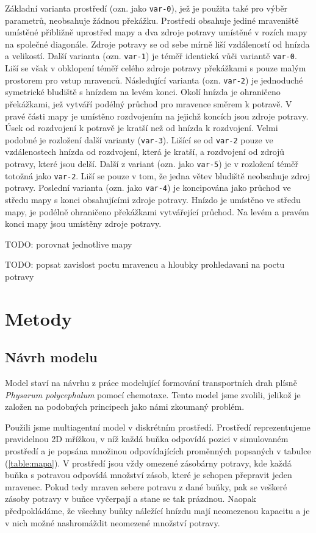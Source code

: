 \documentclass[10pt,a4paper,twocolumn]{article}
\begin{document}
Základní varianta prostředí (ozn. jako \texttt{var-0}), jež je použita 
také pro výběr parametrů, neobsahuje žádnou překážku. Prostředí obsahuje 
jediné mraveniště umístěné přibližně uprostřed mapy a dva zdroje potravy
umístěné v rozích mapy na společné diagonále. Zdroje potravy se od sebe 
mírně liší vzdáleností od hnízda a velikostí. Další varianta 
(ozn. \texttt{var-1}) je téměř identická vůči variantě
\texttt{var-0}. Liší se však v obklopení téměř celého zdroje
potravy překážkami s pouze malým prostorem pro vstup mravenců. Následující
varianta (ozn. \texttt{var-2}) je jednoduché symetrické bludiště s hnízdem 
na levém konci. Okolí hnízda je ohraničeno překážkami, jež vytváří podélný 
průchod pro mravence směrem k potravě. V pravé části mapy je umístěno 
rozdvojením na jejichž koncích jsou zdroje potravy. Úsek od rozdvojení
k potravě je kratší než od hnízda k rozdvojení. Velmi podobné je rozložení
další varianty (\texttt{var-3}). Lišící se od \texttt{var-2} pouze ve 
vzdálenostech hnízda od rozdvojení, která je kratší, a rozdvojení od 
zdrojů potravy, které jsou delší. Další z variant (ozn. jako \texttt{var-5})
je v rozložení téměř totožná jako \texttt{var-2}. Liší se pouze v tom, že 
jedna větev bludiště neobsahuje zdroj potravy. Poslední varianta (ozn. jako
\texttt{var-4}) je koncipována jako průchod ve středu mapy s konci 
obsahujícími zdroje potravy. Hnízdo je umístěno ve středu mapy, je 
podélně ohraničeno překážkami vytvářející průchod. Na levém a pravém konci
mapy jsou umístěny zdroje potravy.  





TODO: porovnat jednotlive mapy

TODO: popsat zavislost poctu mravencu a hloubky prohledavani na poctu potravy



\section*{Metody}

\subsection*{Návrh modelu}
Model staví na návrhu z práce \citet{jones2010characteristics}
modelující formování transportních drah plísně \emph{Physarum polycephalum}
pomocí chemotaxe. Tento model jsme zvolili, jelikož je založen na podobných 
principech jako námi zkoumaný problém.

Použili jsme multiagentní model v diskrétním prostředí. Prostředí reprezentujeme 
pravidelnou 2D mřížkou, v níž každá buňka odpovídá pozici v simulovaném prostředí a je 
popsána množinou odpovídajících proměnných popsaných v tabulce (\ref{table:mapa}).
V prostředí jsou vždy omezené zásobárny potravy, kde každá buňka s potravou
odpovídá množství zásob, které je schopen přepravit jeden mravenec. Pokud
tedy mraven sebere potravu z dané buňky, pak se veškeré zásoby potravy v 
buňce vyčerpají a stane se tak prázdnou. Naopak předpokládáme, že všechny
buňky náležící hnízdu mají neomezenou kapacitu a je v nich možné 
nashromáždit neomezené množství potravy.
\end{document}
